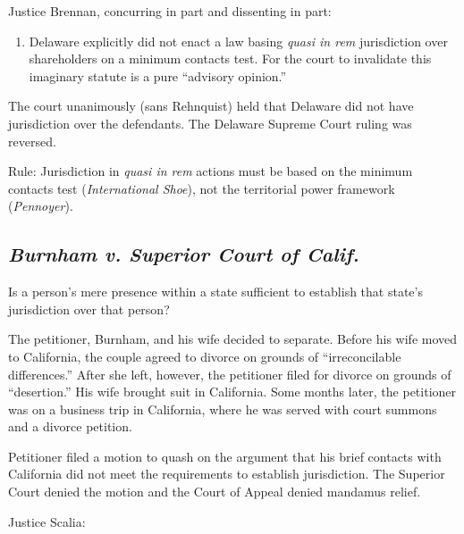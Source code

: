 Justice Brennan, concurring in part and dissenting in part:

\begin{enumerate}
\item
  Delaware explicitly did not enact a law basing \emph{quasi in rem}
  jurisdiction over shareholders on a minimum contacts test. For the
  court to invalidate this imaginary statute is a pure ``advisory
  opinion.''
\end{enumerate}


The court unanimously (sans Rehnquist) held that Delaware did not have
jurisdiction over the defendants. The Delaware Supreme Court ruling was
reversed.

Rule: Jurisdiction in \emph{quasi in rem} actions must be based on the minimum
contacts test (\emph{International Shoe}), not the territorial power
framework (\emph{Pennoyer}).


\subsection{\emph{Burnham v. Superior Court of Calif.}}

Is a person's mere presence within a state sufficient to establish that
state's jurisdiction over that person?

The petitioner, Burnham, and his wife decided to separate. Before his
wife moved to California, the couple agreed to divorce on grounds of
``irreconcilable differences.'' After she left, however, the petitioner
filed for divorce on grounds of ``desertion.'' His wife brought suit in
California. Some months later, the petitioner was on a business trip in
California, where he was served with court summons and a divorce
petition.

Petitioner filed a motion to quash on the argument that his brief
contacts with California did not meet the requirements to establish
jurisdiction. The Superior Court denied the motion and the Court of
Appeal denied mandamus relief.

Justice Scalia:

